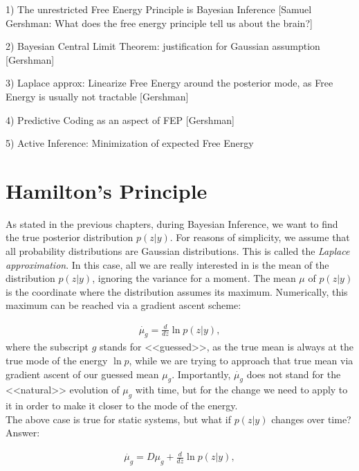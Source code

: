 1) The unrestricted Free Energy Principle is Bayesian Inference [Samuel Gershman: What does the free energy principle tell us about the brain?]

2) Bayesian Central Limit Theorem: justification for Gaussian assumption [Gershman]

3) Laplace approx: Linearize Free Energy around the posterior mode, as Free Energy is usually not tractable [Gershman]

4) Predictive Coding as an aspect of FEP [Gershman]

5) Active Inference: Minimization of expected Free Energy

\chapter{Hamilton's Principle}

As stated in the previous chapters, during Bayesian Inference, we want to find the true posterior distribution $p(z|y)$. For reasons of simplicity, we assume that all probability distributions are Gaussian distributions. This is called the \textit{Laplace approximation}. In this case, all we are really interested in is the mean of the distribution $p(z|y)$, ignoring the variance for a moment. The mean $\mu$ of $p(z|y)$ is the coordinate where the distribution assumes its maximum. Numerically, this maximum can be reached via a gradient ascent scheme:

\begin{align*}
\dot{\mu_g} = \frac{d}{dz} \ln p(z|y),
\end{align*}
where the subscript $g$ stands for <<guessed>>, as the true mean is always at the true mode of the energy $\ln p$, while we are trying to approach that true mean via gradient ascent of our guessed mean $\mu_g$. Importantly,  $\dot{\mu_g}$ does not stand for the <<natural>> evolution of $\mu_g$ with time, but for the change we need to apply to it in order to make it closer to the mode of the energy. \\

\noindent The above case is true for static systems, but what if $p(z|y)$ changes over time? Answer:

\begin{align*}
\dot{\mu_g} = D\mu_g + \frac{d}{dz} \ln p(z|y),
\end{align*}

